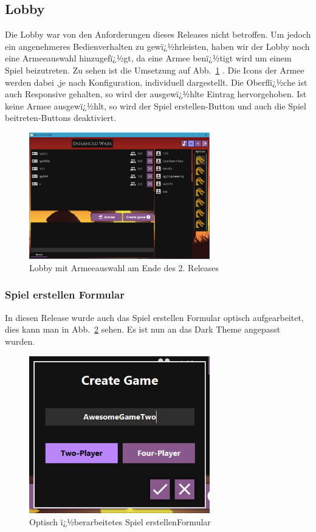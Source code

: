 \documentclass[12pt, titlepage]{scrartcl}
\newcommand{\Abb}[1]{%
	Abb.\ \ref{#1}%
}
\begin{document}
			\subsection{Lobby}
			Die Lobby war von den Anforderungen dieses Releases nicht betroffen. Um jedoch ein angenehmeres Bedienverhalten zu gewï¿½hrleisten, haben wir der Lobby noch eine Armeeauswahl hinzugefï¿½gt, da eine Armee benï¿½tigt wird um einem Spiel beizutreten. Zu sehen ist die Umsetzung auf \Abb{LobbyFinal}. Die Icons der Armee werden dabei ,je nach Konfiguration, individuell dargestellt. Die Oberflï¿½che ist auch Responsive gehalten, so wird der ausgewï¿½hlte Eintrag hervorgehoben. Ist keine Armee ausgewï¿½hlt, so wird der Spiel erstellen-Button und auch die Spiel beitreten-Buttons deaktiviert.
			\begin{figure}[H] 
				\centering
				\includegraphics[width=0.7\textwidth]{Lobby_final.PNG}
				\caption{Lobby mit Armeeauswahl am Ende des 2. Releases}
				\label{LobbyFinal}
			\end{figure}
			
				\subsubsection{Spiel erstellen Formular}
				In diesen Release wurde auch das Spiel erstellen Formular optisch aufgearbeitet, dies kann man in \Abb{CreateGameFormularReworked} sehen. Es ist nun an das Dark Theme angepasst wurden.
				\begin{figure}[H] 
					\centering
					\includegraphics[width=0.7\textwidth]{Create_Game_final.PNG}
					\caption{Optisch ï¿½berarbeitetes \glqq Spiel erstellen\grqq Formular }
					\label{CreateGameFormularReworked}
				\end{figure}
			
\end{document}
